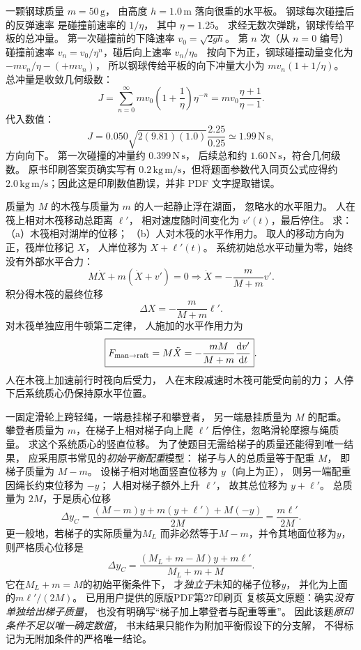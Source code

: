 一颗钢球质量 $m=50\,\mathrm g$，
由高度 $h=1.0\,\mathrm m$ 落向很重的水平板。
钢球每次碰撞后的反弹速率
是碰撞前速率的 $1/\eta$，
其中 $\eta=1.25$。
求经无数次弹跳，钢球传给平板的总冲量。
\exsolution
第一次碰撞前的下降速率
$v_0=\sqrt{2gh}$。
第 $n$ 次（从 $n=0$ 编号）碰撞前速率
$v_n=v_0/\eta^n$，碰后向上速率 $v_n/\eta$。
按向下为正，钢球碰撞动量变化为
$-m v_n/\eta-(+m v_n)$，
所以钢球传给平板的向下冲量大小为
$m v_n(1+1/\eta)$。
总冲量是收敛几何级数：
\[
J=\sum_{n=0}^\infty m v_0
\left(1+\frac1\eta\right)\eta^{-n}
=mv_0\frac{\eta+1}{\eta-1}.
\]
代入数值：
\[
\boxed{J=
0.050\sqrt{2(9.81)(1.0)}
\frac{2.25}{0.25}
\simeq1.99\,\mathrm{N\,s}},
\]
方向向下。
\excheck 第一次碰撞的冲量约 $0.399\,\mathrm{N\,s}$，
后续总和约 $1.60\,\mathrm{N\,s}$，符合几何级数。
原书印刷答案页确实写有 $0.2\,\mathrm{kg\,m/s}$，但将题面参数代入同页公式应得约 $2.0\,\mathrm{kg\,m/s}$；因此这是印刷数值勘误，并非 PDF 文字提取错误。

质量为 $M$ 的木筏与质量为 $m$ 的人一起静止浮在湖面，
忽略水的水平阻力。
人在筏上相对木筏移动总距离 $\ell'$，
相对速度随时间变化为 $v'(t)$，最后停住。
求：（a）木筏相对湖岸的位移；
（b）人对木筏的水平作用力。
\exsolution
取人的移动方向为正，筏岸位移记 $X$，
人岸位移为 $X+\ell'(t)$。
系统初始总水平动量为零，始终没有外部水平合力：
\[
M\dot X+m(\dot X+v')=0
\Longrightarrow
\dot X=-\frac{m}{M+m}v'.
\]
积分得木筏的最终位移
\[
\boxed{\Delta X=-\frac{m}{M+m}\ell'}.
\]
对木筏单独应用牛顿第二定律，
人施加的水平作用力为
\[
\boxed{F_{\rm man\to raft}=M\ddot X
=-\frac{mM}{M+m}\frac{\mathrm dv'}{\mathrm dt}}.
\]
\excheck 人在木筏上加速前行时筏向后受力，
人在末段减速时木筏可能受向前的力；
人停下后系统质心仍保持原水平位置。

一固定滑轮上跨轻绳，一端悬挂梯子和攀登者，
另一端悬挂质量为 $M$ 的配重。
攀登者质量为 $m$，在梯子上相对梯子向上爬
$\ell'$ 后停住，忽略滑轮摩擦与绳质量。
求这个系统质心的竖直位移。
\exsolution
为了使题目无需给梯子的质量还能得到唯一结果，
应采用原书常见的\emph{初始平衡配重}模型：
梯子与人的总质量等于配重 $M$，
即梯子质量为 $M-m$。
设梯子相对地面竖直位移为 $y$（向上为正），
则另一端配重因绳长约束位移为 $-y$；
人相对梯子额外上升 $\ell'$，
故其总位移为 $y+\ell'$。
总质量为 $2M$，于是质心位移
\[
\Delta y_C=
\frac{(M-m)y+m(y+\ell')+M(-y)}{2M}
=\boxed{\frac{m\ell'}{2M}}.
\]
更一般地，若梯子的实际质量为$M_L$
而非必然等于$M-m$，并令其地面位移为$y$，
则严格质心位移是
\[
 \boxed{\Delta y_C=
 \frac{(M_L+m-M)y+m\ell'}{M_L+m+M}}.
\]
它在$M_L+m=M$的初始平衡条件下，
才\emph{独立于}未知的梯子位移$y$，
并化为上面的$m\ell'/(2M)$。
\excheck 已用用户提供的原版PDF第27印刷页
复核英文原题：确实\emph{没有单独给出梯子质量}，
也没有明确写“梯子加上攀登者与配重等重”。
因此该题\emph{原印条件不足以唯一确定数值}，
书末结果只能作为附加平衡假设下的分支解，
不得标记为无附加条件的严格唯一结论。
